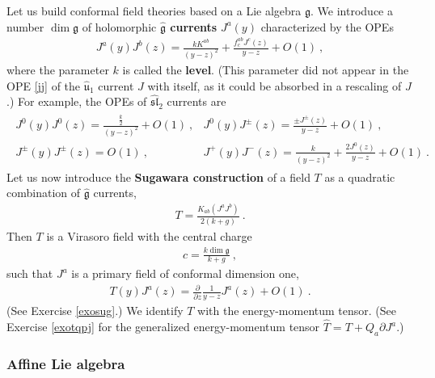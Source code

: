 \documentclass[12pt, a4paper, notitlepage, twoside]{report}
\numberwithin{equation}{section}
\theoremstyle{break}
\begin{document}
Let us build conformal field theories based on a Lie algebra $\mathfrak{g}$. 
We introduce a number $\dim \mathfrak{g}$ of holomorphic \textbf{\boldmath $\hat{\mathfrak{g}}$ currents} $J^a(y)$ characterized by the OPEs 
\begin{align}
 \boxed{ J^a(y) J^b(z) = \frac{k K^{ab}}{(y-z)^2} +  \frac{ f^{ab}_c J^c(z)}{y-z}  + O(1)} \ ,
\label{jajb}
\end{align}
where the parameter $k$ is called the \textbf{level}. (This parameter did not appear in the OPE \eqref{jj} of the $\hat{\mathfrak{u}}_1$ current $J$ with itself, as it could be absorbed in a rescaling of $J$.) For example, the OPEs of $\widehat{\mathfrak{sl}}_2$ currents are
\begin{align}
\begin{array}{ll}
  J^0(y)J^0(z) = \frac{\frac{k}{2}}{(y-z)^2} + O(1)\ ,  & J^0(y)J^\pm(z) = \frac{\pm J^\pm(z)}{y-z} + O(1)\ ,
\\
 J^\pm(y)J^\pm(z) = O(1) \ , & J^+(y)J^-(z) = \frac{k}{(y-z)^2} + \frac{2J^0(z)}{y-z} + O(1)\ .
\end{array}
\label{jjjj}
\end{align}
Let us now introduce the \textbf{\boldmath Sugawara construction} of a field $T$ as a quadratic combination of $\hat{\mathfrak{g}}$ currents,
\begin{align}
\boxed{ T =  \frac{ K_{ab} (J^aJ^b)}{2(k+g)} } \ .
\label{tjj} 
\end{align}
Then $T$ is a Virasoro field with the central charge 
\begin{align}
 \boxed{ c = \frac{ k \dim \mathfrak{g}}{k+g} }\ ,
\label{ckg}
\end{align}
such that $J^a$ is a primary field of conformal dimension one, 
\begin{align}
\boxed{ T(y)J^a(z) = {\frac{\partial}{\partial z}} \frac{1}{y-z} J^a(z) + O(1)} \ .
\label{tja}
\end{align}
(See Exercise \ref{exosug}.)
We identify $T$ with the energy-momentum tensor.
(See Exercise \ref{exotqpj} for the generalized energy-momentum tensor $\hat{T} = T + Q_a\partial J^a$.)

\subsubsection{Affine Lie algebra}
\end{document}
